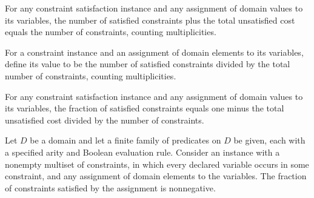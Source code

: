 \begin{theorem}
\label{FABL.CSPInstance.satisfiedCount_add_unsatisfiedCost}
\leanok
{}
For any constraint satisfaction instance and any assignment of domain values to its
variables, the number of satisfied constraints plus the total unsatisfied cost equals
the number of constraints, counting multiplicities.
\end{theorem}

\begin{definition}
\label{FABL.CSPInstance.value}
\leanok
{}
For a constraint instance and an assignment of domain elements to its variables, define
its value to be the number of satisfied constraints divided by the total number of
constraints, counting multiplicities.
\end{definition}

\begin{theorem}
\label{FABL.CSPInstance.value_eq_one_sub_unsatisfiedCost_div}
\leanok
{}
For any constraint satisfaction instance and any assignment of domain values to its
variables, the fraction of satisfied constraints equals one minus the total unsatisfied
cost divided by the number of constraints.
\end{theorem}

\begin{theorem}
\label{FABL.CSPInstance.value_nonneg}
\leanok
{}
Let $D$ be a domain and let a finite family of predicates on $D$ be given, each with a
specified arity and Boolean evaluation rule. Consider an instance with a nonempty
multiset of constraints, in which every declared variable occurs in some constraint, and
any assignment of domain elements to the variables. The fraction of constraints
satisfied by the assignment is nonnegative.
\end{theorem}

